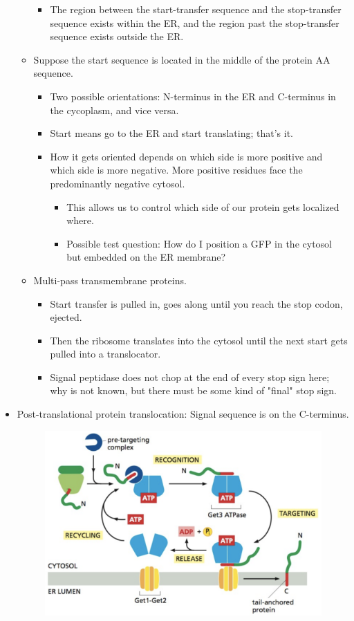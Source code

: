 \documentclass[../notes.tex]{subfiles}
\begin{document}
\begin{itemize}
\begin{itemize}
\begin{itemize}
            \item The region between the start-transfer sequence and the stop-transfer sequence exists within the ER, and the region past the stop-transfer sequence exists outside the ER.
        \end{itemize}
        \item Suppose the start sequence is located in the middle of the protein AA sequence.
        \begin{itemize}
            \item Two possible orientations: N-terminus in the ER and C-terminus in the cycoplasm, and vice versa.
            \item Start means go to the ER and start translating; that's it.
            \item How it gets oriented depends on which side is more positive and which side is more negative. More positive residues face the predominantly negative cytosol.
            \begin{itemize}
                \item This allows us to control which side of our protein gets localized where.
                \item Possible test question: How do I position a GFP in the cytosol but embedded on the ER membrane?
            \end{itemize}
        \end{itemize}
        \item Multi-pass transmembrane proteins.
        \begin{itemize}
            \item Start transfer is pulled in, goes along until you reach the stop codon, ejected.
            \item Then the ribosome translates into the cytosol until the next start gets pulled into a translocator.
            \item Signal peptidase does not chop at the end of every stop sign here; why is not known, but there must be some kind of "final" stop sign.
        \end{itemize}
    \end{itemize}
    \item Post-translational protein translocation: Signal sequence is on the C-terminus.
    \begin{figure}[h!]
        \centering
        \includegraphics[width=0.5\linewidth]{../ExtFiles/GetPathway.png}

\end{figure}
\end{itemize}
\end{document}
